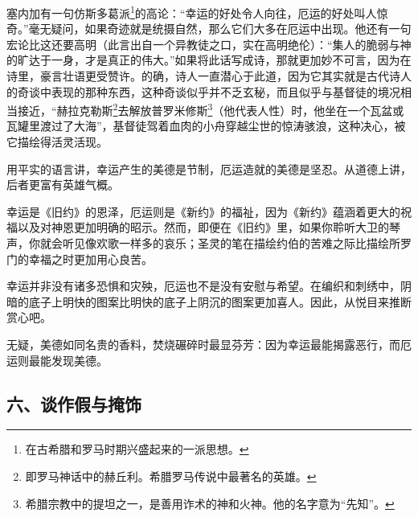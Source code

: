 \par 塞内加有一句仿斯多葛派\footnote{在古希腊和罗马时期兴盛起来的一派思想。}的高论：“幸运的好处令人向往，厄运的好处叫人惊奇。”毫无疑问，如果奇迹就是统摄自然，那么它们大多在厄运中出现。他还有一句宏论比这还要高明（此言出自一个异教徒之口，实在高明绝伦）：“集人的脆弱与神的旷达于一身，才是真正的伟大。”如果将此话写成诗，那就更加妙不可言，因为在诗里，豪言壮语更受赞许。的确，诗人一直潜心于此道，因为它其实就是古代诗人的奇谈中表现的那种东西，这种奇谈似乎并不乏玄秘，而且似乎与基督徒的境况相当接近，“赫拉克勒斯\footnote{即罗马神话中的赫丘利。希腊罗马传说中最著名的英雄。}去解放普罗米修斯\footnote{希腊宗教中的提坦之一，是善用诈术的神和火神。他的名字意为“先知”。}（他代表人性）时，他坐在一个瓦盆或瓦罐里渡过了大海”，基督徒驾着血肉的小舟穿越尘世的惊涛骇浪，这种决心，被它描绘得活灵活现。
\par 用平实的语言讲，幸运产生的美德是节制，厄运造就的美德是坚忍。从道德上讲，后者更富有英雄气概。
\par 幸运是《旧约》的恩泽，厄运则是《新约》的福祉，因为《新约》蕴涵着更大的祝福以及对神恩更加明确的昭示。然而，即便在《旧约》里，如果你聆听大卫的琴声，你就会听见像欢歌一样多的哀乐；圣灵的笔在描绘约伯的苦难之际比描绘所罗门的幸福之时更加用心良苦。
\par 幸运并非没有诸多恐惧和灾殃，厄运也不是没有安慰与希望。在编织和刺绣中，阴暗的底子上明快的图案比明快的底子上阴沉的图案更加喜人。因此，从悦目来推断赏心吧。
\par 无疑，美德如同名贵的香料，焚烧碾碎时最显芬芳：因为幸运最能揭露恶行，而厄运则最能发现美德。


\subsection*{六、谈作假与掩饰}


